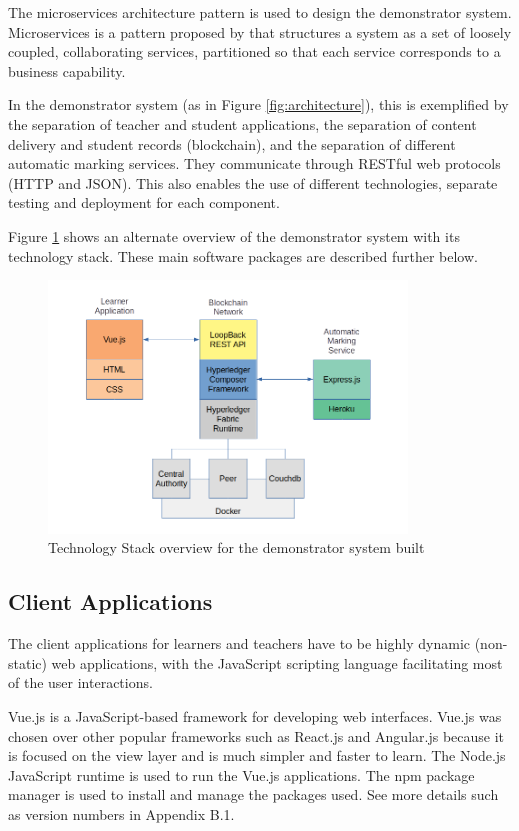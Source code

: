 The microservices architecture pattern is used to design the demonstrator system. Microservices is a pattern proposed by
\citet{richardson2018ms} that structures a system as a set of loosely coupled, collaborating services, partitioned so that
each service corresponds to a business capability.

In the demonstrator system (as in Figure \ref{fig:architecture}), this is exemplified by the separation of teacher and student applications,
the separation of content delivery and student records (blockchain), and the separation of different automatic marking services.
They communicate through RESTful web protocols (HTTP and JSON).
This also enables the use of different technologies, separate testing and deployment for each component.

Figure \ref{fig:techstack} shows an alternate overview of the demonstrator system with its technology stack.
These main software packages are described further below.

\begin{figure}[!ht]
	\centering
	\includegraphics[width=0.85\textwidth]{techstack}
	\caption[Demonstrator Technology Stack]
	{Technology Stack overview for the demonstrator system built}
	\label{fig:techstack}
\end{figure}

\subsection{Client Applications}

The client applications for learners and teachers have to be highly dynamic (non-static) web applications,
with the JavaScript scripting language facilitating most of the user interactions.

Vue.js is a JavaScript-based framework for developing web interfaces. Vue.js was chosen over other
popular frameworks such as React.js and Angular.js because it is focused on the view layer and is much
simpler and faster to learn. The Node.js JavaScript runtime is used to run the Vue.js applications. The npm package manager
is used to install and manage the packages used. See more details such as version numbers in Appendix B.1.


